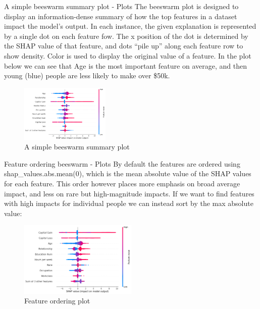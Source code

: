 \documentclass[aspectratio=169]{beamer}
\begin{document}
\begin{frame}{A simple beeswarm summary plot - Plots}
The beeswarm plot is designed to display an information-dense summary of how the top features in a dataset impact the model’s output. In each instance, the given explanation is represented by a single dot on each feature fow. The x position of the dot is determined by the \ac{SHAP} value of that feature, and dots “pile up” along each feature row to show density. Color is used to display the original value of a feature. In the plot below we can see that Age is the most important feature on average, and then young (blue) people are less likely to make over \$50k.
    \begin{figure}[htbp]
        \centering
        \includegraphics[width=0.38\textwidth]{figs/shap/plots/beeswarm/example_notebooks_api_examples_plots_beeswarm_3_0.png}
        \caption{A simple beeswarm summary plot}
        \label{fig:simple-beeswarm}
    \end{figure}
\end{frame}

\begin{frame}{Feature ordering beeswarm - Plots}
By default the features are ordered using shap\_values.abs.mean(0), which is the mean absolute value of the \ac{SHAP} values for each feature. This order however places more emphasis on broad average impact, and less on rare but high-magnitude impacts. If we want to find features with high impacts for individual people we can instead sort by the max absolute value:
    \begin{figure}[htbp]
        \centering
        \includegraphics[width=0.50\textwidth]{figs/shap/plots/beeswarm/example_notebooks_api_examples_plots_beeswarm_7_0.png}
        \caption{Feature ordering plot}
        \label{fig:feature-beeswarm}
    \end{figure}
\end{frame}
\end{document}
